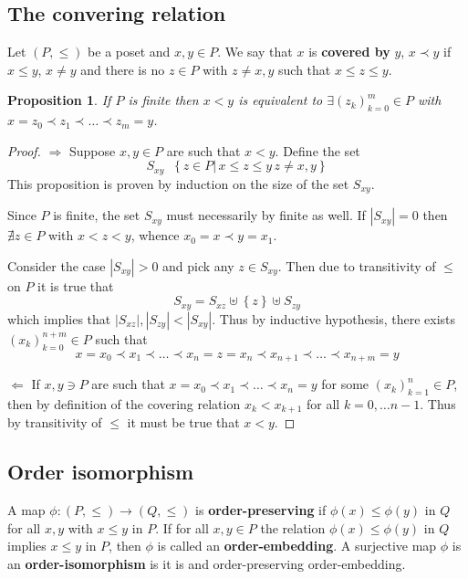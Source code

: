 \documentclass[a4paper]{article}
\newcommand{\obj}[1]{{\left\{ #1 \right \}}}
\newcommand{\brac}[1]{{\left ( #1 \right )}}
\newcommand{\induc}[1]{{\left . #1 \right \vert}}
\newcommand{\abs}[1]{{\left | #1 \right |}}
\newtheorem{prop}{Proposition}
\newcommand{\defn}{\mathop{\overset{\Delta}{=}}\nolimits}
\begin{document}
\subsection{The convering relation} %
\label{sub:the_convering_relation}

Let $(P,\leq)$ be a poset and $x, y\in P$. We say that $x$ is \textbf{covered by} $y$, $x\prec y$ if $x\leq y$, $x\neq y$ and there is no $z\in P$ with $z\neq x, y$ such that $x \leq z \leq y$.

\begin{prop} If $P$ is finite then $x<y$ is equivalent to $\exists \brac{z_k}_{k=0}^m\in P$ with $x = z_0\prec z_1\prec \ldots \prec z_m = y$.
\end{prop}

\begin{proof}
$\Rightarrow$ Suppose $x,y\in P$ are such that $x<y$. Define the set \[S_{xy}\defn \obj{\induc{z\in P}\,x \leq z \leq y\,z\neq x,y}\] This proposition is proven by induction on the size of the set $S_{xy}$.

Since $P$ is finite, the set $S_{xy}$ must necessarily by finite as well. If $\abs{S_{xy}} = 0$ then $\nexists z\in P$ with $x<z<y$, whence $x_0 = x\prec y = x_1$.

Consider the case $\abs{S_{xy}}>0$ and pick any $z\in S_{xy}$. Then due to transitivity of $\leq$ on $P$ it is true that \[S_{xy} = S_{xz}\uplus \obj{z}\uplus S_{zy}\] which implies that $\abs{S_{xz}},\abs{S_{zy}}<\abs{S_{xy}}$. Thus by inductive hypothesis, there exists $\brac{x_k}_{k=0}^{n+m}\in P$ such that \[x = x_0 \prec x_1 \prec \ldots \prec x_n = z = x_n \prec x_{n+1} \prec \ldots \prec x_{n+m} = y\]

$\Leftarrow$ If $x,y\ni P$ are such that $x = x_0 \prec x_1 \prec \ldots \prec x_n = y$ for some $\brac{x_k}_{k=1}^n\in P$, then by definition of the covering relation $x_k<x_{k+1}$ for all $k=0,\ldots {n-1}$. Thus by transitivity of $\leq$ it must be true that $x<y$.

\end{proof}


\subsection{Order isomorphism} %
\label{sub:order_isomorphism}

A map $\phi:(P,\leq)\to (Q,\leq)$ is \textbf{order-preserving} if $\phi(x)\leq \phi(y)$ in $Q$ for all $x,y$ with $x\leq y$ in $P$. If for all $x,y\in P$ the relation $\phi(x)\leq \phi(y)$ in $Q$ implies $x\leq y$ in $P$, then $\phi$ is called an \textbf{order-embedding}. A surjective map $\phi$ is an \textbf{order-isomorphism} is it is and order-preserving order-embedding.
\end{document}
